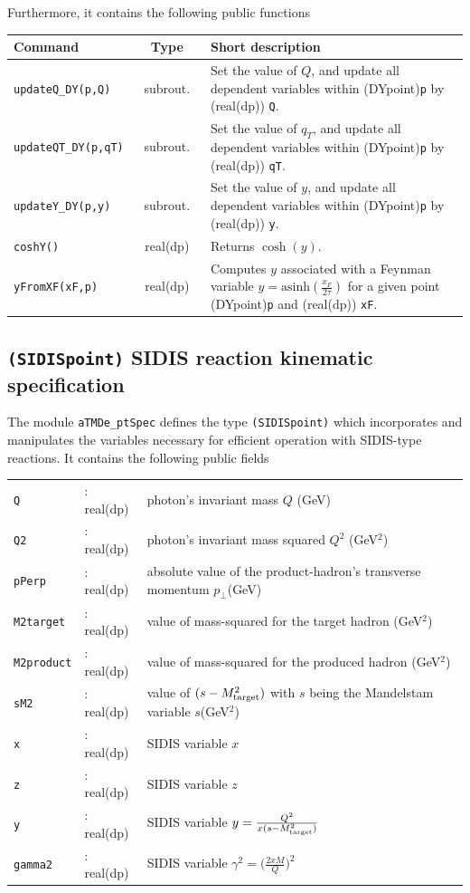 \documentclass[prd,nofootinbib,eqsecnum,final]{revtex4}
\renewcommand{\(}{\left(}
\renewcommand{\)}{\right)}
\renewcommand{\[}{\left[}
\renewcommand{\]}{\right]}
\begin{document}
Furthermore, it contains the following public functions
\begin{center}
\begin{tabular}{||p{4cm}|c|p{9cm}||}
\hline\hline
Command & ~~Type~~&  Short description
\\\hline
\texttt{updateQ\_DY(p,Q)} & subrout. & Set the value of $Q$, and update all dependent variables within (DYpoint)\texttt{p} by (real(dp)) \texttt{Q}.
\\\hline
\texttt{updateQT\_DY(p,qT)} & subrout. & Set the value of $q_T$, and update all dependent variables within (DYpoint)\texttt{p} by (real(dp)) \texttt{qT}.
\\\hline
\texttt{updateY\_DY(p,y)} & subrout. & Set the value of $y$, and update all dependent variables within (DYpoint)\texttt{p} by (real(dp)) \texttt{y}.
\\\hline
\texttt{coshY()} & real(dp) & Returns $\cosh(y)$.
\\\hline
\texttt{yFromXF(xF,p)} & real(dp) & Computes $y$ associated with a Feynman variable $y=\text{asinh}(\frac{x_F}{2\tau})$ for a given point (DYpoint)\texttt{p} and (real(dp)) \texttt{xF}.
\\\hline\hline
\end{tabular}
\end{center}

\subsection{\texttt{(SIDISpoint)} SIDIS reaction kinematic specification}
\label{sec:SIDISpoint}


The module \texttt{aTMDe\_ptSpec} defines the type \texttt{(SIDISpoint)} which incorporates and manipulates the variables necessary for efficient operation with SIDIS-type reactions. It contains the following public fields
\begin{tabular}{lll}
\texttt{Q} &: real(dp)& photon's invariant mass $Q$ (GeV)
\\
\texttt{Q2} &: real(dp)& photon's invariant mass squared $Q^2$ (GeV$^2$)
\\
\texttt{pPerp} &: real(dp)& absolute value of the product-hadron's transverse momentum $p_\perp$(GeV)
\\
\texttt{M2target} &: real(dp)& value of mass-squared for the target hadron (GeV$^2$)
\\
\texttt{M2product} &: real(dp)& value of mass-squared for the produced hadron (GeV$^2$)
\\
\texttt{sM2} &: real(dp)& value of $(s-M_{\rm target}^2)$ with $s$ being the Mandelstam variable $s$(GeV$^2$)
\\
\texttt{x} &: real(dp)& SIDIS variable $x$
\\
\texttt{z} &: real(dp)& SIDIS variable $z$
\\
\texttt{y} &: real(dp)& SIDIS variable $y=\frac{Q^2}{x(s-M_{\rm target}^2)}$
\\
\texttt{gamma2} &: real(dp)& SIDIS variable $\gamma^2=\big(\frac{2xM}{Q}\big)^2$
\end{tabular}
\end{document}
